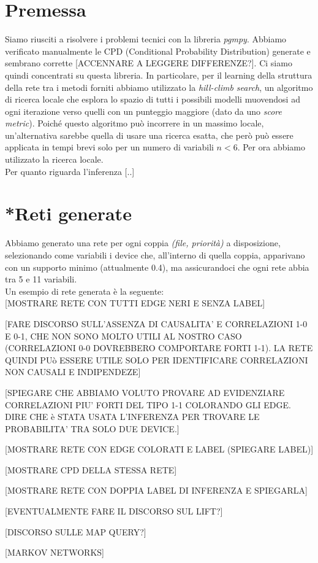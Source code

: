 \documentclass[a4paper]{article}
\begin{document}
\section*{Premessa}
Siamo riusciti a risolvere i problemi tecnici con la libreria \textit{pgmpy}. Abbiamo verificato manualmente le CPD (Conditional Probability Distribution) generate e sembrano corrette [ACCENNARE A LEGGERE DIFFERENZE?]. Ci siamo quindi concentrati su questa libreria. In particolare, per il learning della struttura della rete tra i metodi forniti abbiamo utilizzato la \textit{hill-climb search}, un algoritmo di ricerca locale che esplora lo spazio di tutti i possibili modelli muovendosi ad ogni iterazione verso quelli con un punteggio maggiore (dato da uno \textit{score metric}). Poiché questo algoritmo può incorrere in un massimo locale, un'alternativa sarebbe quella di usare una ricerca esatta, che però può essere applicata in tempi brevi solo per un numero di variabili $ n < 6 $. Per ora abbiamo utilizzato la ricerca locale.\\
Per quanto riguarda l'inferenza [..]

\section{*Reti generate}
Abbiamo generato una rete per ogni coppia \textit{ (file, priorità) } a disposizione, selezionando come variabili i device che, all'interno di quella coppia, apparivano con un supporto minimo (attualmente 0.4), ma assicurandoci che ogni rete abbia tra 5 e 11 variabili.\\
Un esempio di rete generata è la seguente: \\

[MOSTRARE RETE CON TUTTI EDGE NERI E SENZA LABEL]

[FARE DISCORSO SULL'ASSENZA DI CAUSALITA' E CORRELAZIONI 1-0 E 0-1, CHE NON SONO MOLTO UTILI AL NOSTRO CASO (CORRELAZIONI 0-0 DOVREBBERO COMPORTARE FORTI 1-1). LA RETE QUINDI PUò ESSERE UTILE SOLO PER IDENTIFICARE CORRELAZIONI NON CAUSALI E INDIPENDEZE]

[SPIEGARE CHE ABBIAMO VOLUTO PROVARE AD EVIDENZIARE CORRELAZIONI PIU' FORTI DEL TIPO 1-1 COLORANDO GLI EDGE. DIRE CHE è STATA USATA L'INFERENZA PER TROVARE LE PROBABILITA' TRA SOLO DUE DEVICE.]

[MOSTRARE RETE CON EDGE COLORATI E LABEL (SPIEGARE LABEL)]

[MOSTRARE CPD DELLA STESSA RETE]

[MOSTRARE RETE CON DOPPIA LABEL DI INFERENZA E SPIEGARLA]

[EVENTUALMENTE FARE IL DISCORSO SUL LIFT?]

[DISCORSO SULLE MAP QUERY?]

[MARKOV NETWORKS]
\end{document}

